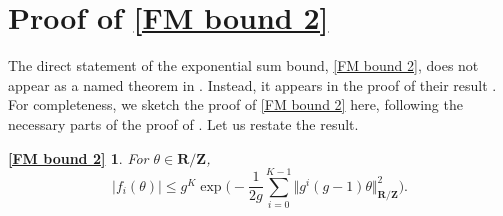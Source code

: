 \documentclass[hidelinks,11pt,reqno]{amsart}
\renewcommand{\leq}{\leqslant}
\newcommand{\Z}{\ensuremath{\mathbf{Z}}}
\newcommand{\R}{\ensuremath{\mathbf{R}}}
\newcommand{\Vertr}{\Vert_{\R/\Z}}
\newtheorem*{fm-rpt}{\cref{FM bound 2}}
\theoremstyle{remark}
\begin{document}
\section{Proof of \cref{FM bound 2}}\label{section FM bound}
The direct statement of the exponential sum bound, \cref{FM bound 2}, does not appear as a named theorem in \cite{fouvry2005entiers}. Instead, it appears in the proof of their result \citep[Theorem 1.2
]{fouvry2005entiers}. For completeness, we sketch the proof of \cref{FM bound 2} here, following the necessary parts of the proof of \citep[Theorem 1.2]{fouvry2005entiers}. Let us restate the result.
\begin{fm-rpt}For $\theta \in \R/\Z$,
     \[|f_{i}(\theta)| \leq g^{K}\exp \Big (-\frac{1}{2g}\sum_{i=0}^{K-1}\Vert g^{i}(g-1)\theta\Vertr^{2}\Big ).\]
\end{fm-rpt}
\end{document}
